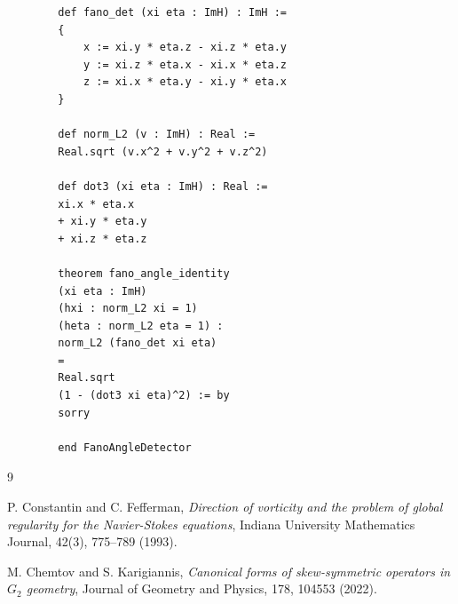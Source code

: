 \documentclass[11pt,twoside,a4paper]{article}
\begin{document}
\begin{verbatim}
		def fano_det (xi eta : ImH) : ImH :=
		{
			x := xi.y * eta.z - xi.z * eta.y
			y := xi.z * eta.x - xi.x * eta.z
			z := xi.x * eta.y - xi.y * eta.x
		}
		
		def norm_L2 (v : ImH) : Real :=
		Real.sqrt (v.x^2 + v.y^2 + v.z^2)
		
		def dot3 (xi eta : ImH) : Real :=
		xi.x * eta.x
		+ xi.y * eta.y
		+ xi.z * eta.z
		
		theorem fano_angle_identity
		(xi eta : ImH)
		(hxi : norm_L2 xi = 1)
		(heta : norm_L2 eta = 1) :
		norm_L2 (fano_det xi eta)
		=
		Real.sqrt
		(1 - (dot3 xi eta)^2) := by
		sorry
		
		end FanoAngleDetector
	\end{verbatim}
	
	\begin{thebibliography}{9}
		
		P. Constantin and C. Fefferman,
		\emph{Direction of vorticity and the problem of global regularity for the Navier-Stokes equations},
		Indiana University Mathematics Journal,
		42(3), 775--789 (1993).
		
		M. Chemtov and S. Karigiannis,
		\emph{Canonical forms of skew-symmetric operators in $G_2$ geometry},
		Journal of Geometry and Physics,
		178, 104553 (2022).
		
	\end{thebibliography}
	
\end{document}
